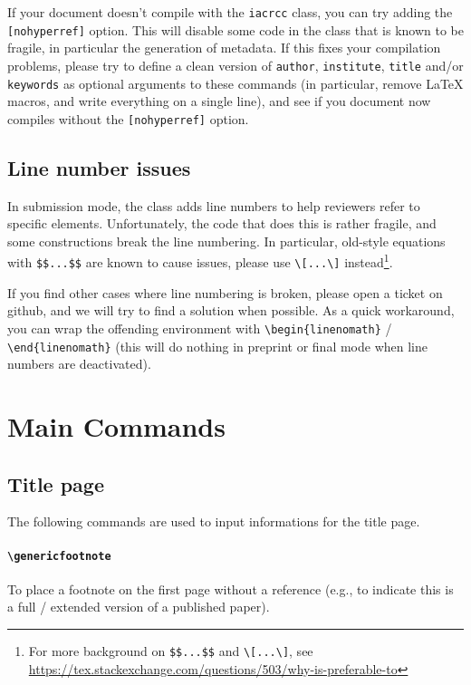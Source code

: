 \documentclass{iacrcc}
\begin{document}
If your document doesn't compile with the \texttt{iacrcc} class,
you can try adding the \texttt{[nohyperref]} option.  This will
disable some code in the class that is known to be fragile, in
particular the generation of metadata.  If this fixes your compilation
problems, please try to define a clean version of \texttt{author}, \texttt{institute},
\texttt{title} and/or \texttt{keywords} as optional arguments to
these commands (in particular, remove \LaTeX{} macros, and write
everything on a single line), and see if you document now compiles
without the \texttt{[nohyperref]} option.

\subsection{Line number issues}

In submission mode, the class adds line numbers to help reviewers refer
to specific elements.  Unfortunately, the code that does this is rather
fragile, and some constructions break the line numbering.  In
particular, old-style equations with \verb+$$...$$+ are known to cause
issues, please use \verb+\[...\]+ instead\footnote{For more background
  on \texttt{\$\$...\$\$} and \texttt{\textbackslash[...\textbackslash]},
  see \url{https://tex.stackexchange.com/questions/503/why-is-preferable-to}}.

If you find other cases where line numbering is broken, please open a
ticket on github, and we will try to find a solution when possible.
As a quick workaround, you can wrap the offending environment with
\verb+\begin{linenomath}+ / \verb+\end{linenomath}+ (this will do
nothing in preprint or final mode when line numbers are deactivated).

\section{Main Commands}

\subsection{Title page}

The following commands are used to input informations for the title page.

\paragraph{\texttt{\textbackslash{}genericfootnote}}
To place a footnote on the first page without a reference (e.g., to indicate this is a full / extended version of a published paper).
\end{document}
